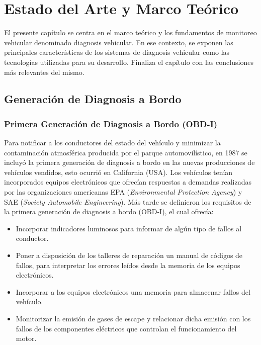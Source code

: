 \chapter[Marco Teórico y Fundamentos]{Estado del Arte y Marco Teórico}

El presente capítulo se centra en el  marco teórico y los fundamentos de  monitoreo vehicular denominado diagnosis vehicular. 
En ese contexto, se exponen las principales características de los sistemas de diagnosis vehicular como las tecnologías utilizadas para su desarrollo. 
Finaliza el capítulo con las conclusiones más relevantes del mismo.


\section{Generación de Diagnosis a Bordo}

\subsection{Primera Generación de Diagnosis a Bordo (OBD-I)}

Para notificar a los conductores del estado del vehículo y minimizar la contaminación atmosférica producida por el parque automovilístico, en 1987 se incluyó la primera generación de diagnosis a bordo en las nuevas producciones de vehículos vendidos, esto ocurrió en California (USA). 
Los vehículos tenían incorporados equipos electrónicos que ofrecían respuestas a demandas realizadas por las organizaciones americanas EPA (\textit{Environmental Protection Agency}) y SAE (\textit{Society Automobile Engineering}). 
Más tarde se definieron los requisitos de la primera generación de diagnosis a bordo (OBD-I), el cual ofrecía:

\begin{itemize}
\item Incorporar indicadores luminosos para informar de algún tipo de fallos al conductor.
\item Poner a disposición de los talleres de reparación un manual de códigos de fallos, para interpretar los errores leídos desde la memoria de los equipos electrónicos.
\item Incorporar a los equipos electrónicos una memoria para almacenar fallos del vehículo. 
\item Monitorizar la emisión de gases de escape y relacionar dicha emisión con los fallos de los componentes eléctricos que controlan el funcionamiento del motor.
\end{itemize}

